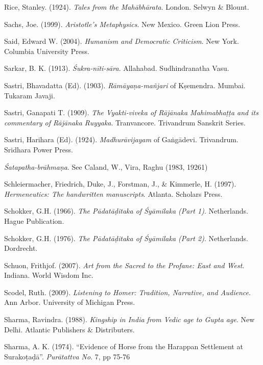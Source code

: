 \begin{thebibliography}{99}
Rice, Stanley. (1924). {\sl Tales from the Mahābhārata}. London. Selwyn \& Blount. 

Sachs, Joe. (1999). {\sl Aristotle’s Metaphysics}. New Mexico. Green Lion Press. 

Said, Edward W. (2004).  {\sl Humanism and Democratic Criticism}. New York. Columbia University Press. 

Sarkar, B. K. (1913). {\sl Śukra-nīti-sāra}. Allahabad. Sudhindranatha Vasu. 

Sastri, Bhavadatta (Ed). (1903). {\sl Rāmāyaṇa-mañjari} of Kṣemendra. Mumbai. Tukaram Javaji. 

Sastri, Ganapati T. (1909). {\sl The Vyakti-viveka of Rājānaka Mahimabhaṭṭa and its commentary of Rājānaka Ruyyaka}. Tranvancore. Trivandrum Sanskrit Series. 

Sastri, Harihara (Ed). (1924). {\sl Madhurāvijayam} of Gaṅgādevi. Trivandrum. Sridhara Power Press. 

{\sl Śatapatha-brāhmaṇa}. See Caland, W., Vira, Raghu (1983, 19261)

Schleiermacher, Friedrich, Duke, J., Forstman, J., \& Kimmerle, H. (1997). {\sl Hermeneutics: The handwritten manuscripts}. Atlanta. Scholars Press.  

Schokker, G.H. (1966). {\sl The Pādatāḍitaka of Śyāmilaka (Part 1)}. Netherlands. Hague Publication. 

Schokker, G.H. (1976). {\sl The Pādatāḍitaka of Śyāmilaka (Part 2)}. Netherlands.  Dordrecht. 

Schuon, Frithjof. (2007). {\sl Art from the Sacred to the Profane: East and West}. Indiana. World Wisdom Inc. 

Scodel, Ruth. (2009). {\sl Listening to Homer: Tradition, Narrative, and Audience}. Ann Arbor. University of Michigan Press. 

Sharma, Ravindra. (1988). {\sl Kingship in India from Vedic age to Gupta age}. New Delhi. Atlantic Publishers \& Distributers. 

Sharma, A. K. (1974). “Evidence of Horse from the Harappan Settlement at Surakoṭaḍā”. {\sl Purātattva No}. 
7, pp 75-76


\end{thebibliography}
